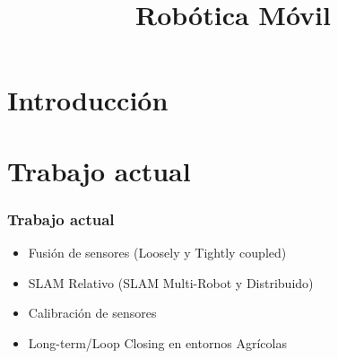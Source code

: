 \documentclass[compress]{beamer}
\title{Robótica Móvil}
\author{}
\institute{Universidad Nacional de Rosario}
\date{}
\begin{document}
\frame{\titlepage}



\section{Introducción}
%

\section{Trabajo actual}
\begin{frame}
    \frametitle{Trabajo actual}
    \begin{itemize}
        \item Fusión de sensores (Loosely y Tightly coupled)
        \item SLAM Relativo (SLAM Multi-Robot y Distribuido)
        \item Calibración de sensores
        \item Long-term/Loop Closing en entornos Agrícolas
    \end{itemize}
\end{frame}

%
\end{document}
